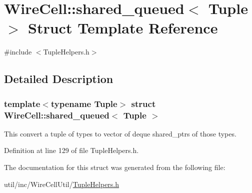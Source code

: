 \hypertarget{struct_wire_cell_1_1shared__queued}{}\section{Wire\+Cell\+:\+:shared\+\_\+queued$<$ Tuple $>$ Struct Template Reference}
\label{struct_wire_cell_1_1shared__queued}


{\ttfamily \#include $<$Tuple\+Helpers.\+h$>$}



\subsection{Detailed Description}
\subsubsection*{template$<$typename Tuple$>$\newline
struct Wire\+Cell\+::shared\+\_\+queued$<$ Tuple $>$}

This convert a tuple of types to vector of deque shared\+\_\+ptr\textquotesingle{}s of those types. 

Definition at line 129 of file Tuple\+Helpers.\+h.



The documentation for this struct was generated from the following file\+:\begin{DoxyCompactItemize}
\item 
util/inc/\+Wire\+Cell\+Util/\hyperlink{_tuple_helpers_8h}{Tuple\+Helpers.\+h}\end{DoxyCompactItemize}
